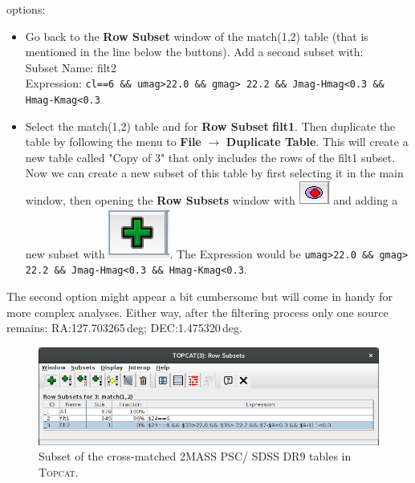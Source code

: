 \documentclass [a4paper, 12pt]{article}
\newcommand{\topcat}{{\textsc{Topcat}}}
\begin{document}
\begin{itemize}
    options:
    \begin{itemize}
        \item Go back to the \textbf{Row Subset} window of the match(1,2) table 
        (that is mentioned in the line below the buttons). Add a second subset 
        with:\\
        Subset Name: filt2\\
        Expression: \texttt{cl==6 \&\& umag>22.0 \&\& gmag> 22.2 \&\& 
        Jmag-Hmag<0.3 \&\& Hmag-Kmag<0.3}\\
        \item Select the match(1,2) table and for \textbf{Row Subset}  
        \textbf{filt1}. Then duplicate the table by following the menu to 
        \textbf{File} $\rightarrow$ \textbf{Duplicate Table}. This will create 
        a new table called "Copy of 3" that only includes the rows of the filt1 
        subset. Now we can create a new subset of this table by first selecting 
        it in the main window, then opening the \textbf{Row Subsets} window 
        with \includegraphics[width=0.04        
        \textwidth]{../images/topcat_button_subset.jpg} and adding a new subset 
        with 
        \includegraphics[width=0.04 
        \textwidth]{../images/topcat_button_add.jpg}. The Expression would be 
        \texttt{umag>22.0 \&\& gmag> 22.2 \&\& Jmag-Hmag<0.3 \&\& 
        Hmag-Kmag<0.3}. 
    \end{itemize} 
    The second option might appear a bit cumbersome but will come in handy for 
    more complex analyses. Either way, after the filtering process only one 
    source remains: RA:127.703265\,deg; DEC:1.475320\,deg. 
    \begin{figure}[H]
        \center
        \includegraphics[width=0.8 
        \textwidth]{../images/topcat_filter_2MASS_SDSS.png}
        \caption{Subset of the cross-matched 2MASS PSC/ SDSS DR9 tables in 
            \topcat. }
        \label{fig:filtering_topcat}
    \end{figure}

\end{itemize}
\end{document}
